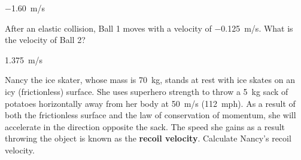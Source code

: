 \documentclass[]{exam}
\begin{document}
\begin{questions}
\begin{center}
\end{center}


\begin{solution}
    \SI{-1.60}{m/s}
\end{solution}


\question 
After an elastic collision, Ball 1 moves with a velocity of \SI{-0.125}{m/s}. What is the velocity of Ball 2?


\begin{center}
\end{center}


\begin{solution}
    \SI{1.375}{m/s}
\end{solution}

\clearpage

\question \label{W5BnBq} %
Nancy the ice skater, whose mass is \SI{70}{kg}, stands at rest with ice skates on an icy (frictionless) surface. She uses superhero strength to throw a \SI{5}{kg} sack of potatoes horizontally away from her body at \SI{50}{m/s} (\SI{112}{mph}). As a result of both the frictionless surface and the law of conservation of momentum, she will accelerate in the direction opposite the sack. The speed she gains as a result throwing the object is known as the \textbf{recoil velocity}. Calculate Nancy's recoil velocity.


\end{questions}
\end{document}
